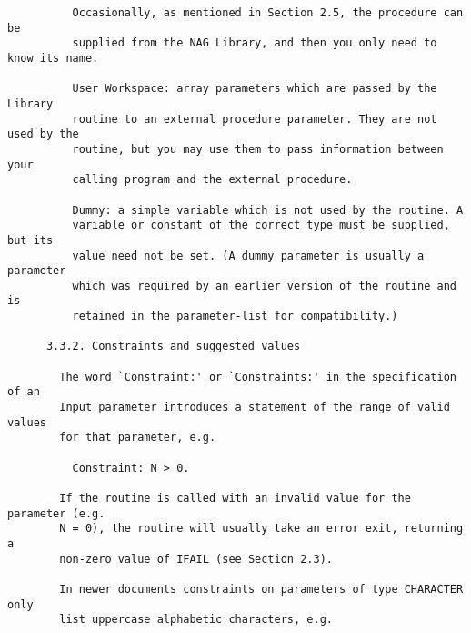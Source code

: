 \begin{small}
\begin{verbatim}
          Occasionally, as mentioned in Section 2.5, the procedure can be        
          supplied from the NAG Library, and then you only need to know its name. 
                                                                                  
          User Workspace: array parameters which are passed by the Library        
          routine to an external procedure parameter. They are not used by the    
          routine, but you may use them to pass information between your          
          calling program and the external procedure.                             
                                                                                  
          Dummy: a simple variable which is not used by the routine. A            
          variable or constant of the correct type must be supplied, but its      
          value need not be set. (A dummy parameter is usually a parameter        
          which was required by an earlier version of the routine and is          
          retained in the parameter-list for compatibility.)                      
                                                                                  
      3.3.2. Constraints and suggested values                                     
                                                                                  
        The word `Constraint:' or `Constraints:' in the specification of an       
        Input parameter introduces a statement of the range of valid values       
        for that parameter, e.g.                                                  
                                                                                  
          Constraint: N > 0.                                                      
                                                                                  
        If the routine is called with an invalid value for the parameter (e.g.    
        N = 0), the routine will usually take an error exit, returning a          
        non-zero value of IFAIL (see Section 2.3).                                
                                                                                  
        In newer documents constraints on parameters of type CHARACTER only       
        list uppercase alphabetic characters, e.g.                                
                                                                                  

\end{verbatim}
\end{small}

